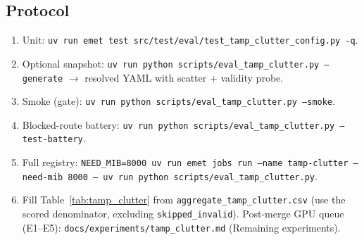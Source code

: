 \subsection{Protocol}
\begin{enumerate}
  \item Unit: \texttt{uv run emet test src/test/eval/test\_tamp\_clutter\_config.py -q}.
  \item Optional snapshot: \texttt{uv run python scripts/eval\_tamp\_clutter.py --generate}
    $\rightarrow$ resolved YAML with scatter + validity probe.
  \item Smoke (gate): \texttt{uv run python scripts/eval\_tamp\_clutter.py --smoke}.
  \item Blocked-route battery: \texttt{uv run python scripts/eval\_tamp\_clutter.py --test-battery}.
  \item Full registry: \texttt{NEED\_MIB=8000 uv run emet jobs run --name tamp-clutter
    --need-mib 8000 -- uv run python scripts/eval\_tamp\_clutter.py}.
  \item Fill Table~\ref{tab:tamp_clutter} from \texttt{aggregate\_tamp\_clutter.csv}
    (use the scored denominator, excluding \texttt{skipped\_invalid}).
    Post-merge GPU queue (E1--E5): \texttt{docs/experiments/tamp\_clutter.md}
    (Remaining experiments).
\end{enumerate}
